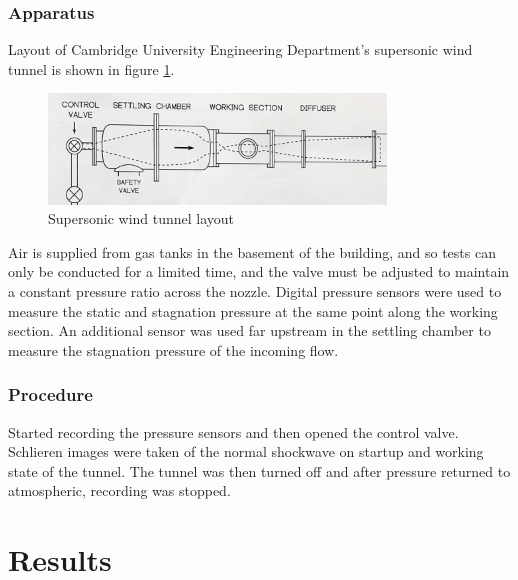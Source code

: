 \documentclass{article}
\begin{document}
\subsubsection{Apparatus}

Layout of Cambridge University Engineering Department's supersonic wind tunnel is shown in figure \ref{fig:supersonic_tunnel}.

\begin{figure}[H]
    \centering
    \includegraphics[width=0.8\textwidth]{supersonic_layout.png}
    \caption{Supersonic wind tunnel layout}
    \label{fig:supersonic_tunnel}
\end{figure}

Air is supplied from gas tanks in the basement of the building, and so tests can only be conducted for a limited time, and the valve must be adjusted to maintain a constant pressure ratio across the nozzle.
Digital pressure sensors were used to measure the static and stagnation pressure at the same point along the working section.
An additional sensor was used far upstream in the settling chamber to measure the stagnation pressure of the incoming flow.

\subsubsection{Procedure}

Started recording the pressure sensors and then opened the control valve.
Schlieren images were taken of the normal shockwave on startup and working state of the tunnel.
The tunnel was then turned off and after pressure returned to atmospheric, recording was stopped.

\section{Results}
\end{document}
